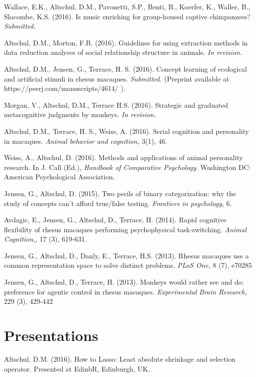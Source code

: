 \documentclass[margin,line]{res}
\begin{document}
\begin{resume}
Wallace, E.K., Altschul, D.M., Pavonetti, S.P., Benti, B., Koerfer, K., Waller, B., Slocombe, K.S. (2016). Is music enriching for group-housed captive chimpanzees?  {\it Submitted.}

Altschul, D.M., Morton, F.B. (2016). Guidelines for using extraction methods in data reduction analyses of social relationship structure in animals.  {\it In revision.}

Altschul, D.M., Jensen, G.,  Terrace, H. S. (2016). Concept learning of ecological and artificial stimuli in rhesus macaques. {\it Submitted.} (Preprint available at https://peerj.com/manuscripts/4614/ ).

Morgan, V., Altschul, D.M., Terrace H.S. (2016). Strategic and graduated metacognitive judgments by monkeys.  {\it In revision.}

Altschul, D.M., Terrace, H. S., Weiss, A. (2016). Serial cognition and personality in macaques. {\it Animal behavior and cognition,} 3(1), 46.

Weiss, A., Altschul, D. (2016). Methods and applications of animal personality research. In J. Call (Ed.), {\it Handbook of Comparative Psychology}. Washington DC: American Psychological Association.

Jensen, G., Altschul, D. (2015). Two perils of binary categorization: why the study of concepts can't afford true/false testing. {\it Frontiers in psychology,} 6.

Avdagic, E., Jensen, G., Altschul, D., Terrace, H. (2014). Rapid cognitive flexibility of rhesus macaques performing psychophysical task-switching. {\it Animal Cognition,}, 17 (3), 619-631.

Jensen, G., Altschul, D., Danly, E., Terrace, H.S. (2013). Rhesus macaques use a common representation space to solve distinct problems. {\it PLoS One,} 8 (7), e70285

Jensen, G., Altschul, D., Terrace, H. (2013). Monkeys would rather see and do: preference for agentic control in rhesus macaques. {\it Experimental Brain Research,} 229 (3), 429-442

\vspace{0.7cm}

\section{\sc Presentations} 

Altschul, D.M. (2016). How to Lasso: Least absolute shrinkage and selection operator. Presented at EdinbR, Edinburgh, UK.


\end{resume}
\end{document}
